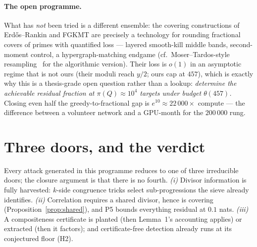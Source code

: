 \paragraph{The open programme.} What has \emph{not} been tried is a
different ensemble: the covering constructions of Erd\H{o}s--Rankin
and FGKMT \cite{Rankin,FGKT,Maynard,FGKMT} are precisely a technology for
rounding fractional covers of primes with quantified loss --- layered
smooth-kill middle bands, second-moment control, a hypergraph-matching
endgame (cf.\ Moser--Tardos-style resampling~\cite{MT} for the
algorithmic version). Their loss is $o(1)$ in an asymptotic regime that
is not ours (their moduli reach $y/2$; ours cap at $457$), which is
exactly why this is a thesis-grade open question rather than a lookup:
\emph{determine the achievable residual fraction at
$\pi(Q)\approx10^4$ targets under budget $\theta(457)$.} Closing even
half the greedy-to-fractional gap is $e^{10}\approx22\,000\times$
compute --- the difference between a volunteer network and a
GPU-month for the $200\,000$ rung.

\section{Three doors, and the verdict}\label{sec:verdict}

Every attack generated in this programme reduces to one of three
irreducible doors; the closure argument is that there is no fourth.
\emph{(i)} Divisor information is fully harvested: $k$-side congruence
tricks select sub-progressions the sieve already identifies.
\emph{(ii)} Correlation requires a shared divisor, hence is covering
(Proposition~\ref{prop:shared}), and P5 bounds everything residual at
$0.1$ nats. \emph{(iii)} A compositeness certificate is planted (then
Lemma~1's accounting applies) or extracted (then it factors); and
certificate-free detection already runs at its conjectured floor (H2).

